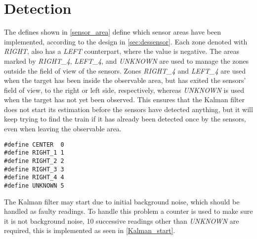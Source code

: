\section{Detection}\label{sec:detectionimp}
The defines shown in \cref{sensor_area} define which sensor areas have been implemented, according to the design in \cref{sec:dessensor}. Each zone denoted with \emph{RIGHT}, also has a \emph{LEFT} counterpart, where the value is negative. The areas marked by \emph{RIGHT\_4}, \emph{LEFT\_4}, and \emph{UNKNOWN} are used to manage the zones outside the field of view of the sensors. Zones \emph{RIGHT\_4} and \emph{LEFT\_4} are used when the target has been inside the observable area, but has exited the sensors' field of view, to the right or left side, respectively, whereas \emph{UNKNOWN} is used when the target has not yet been observed. This ensures that the Kalman filter does not start its estimation before the sensors have detected anything, but it will keep trying to find the train if it has already been detected once by the sensors, even when leaving the observable area.


\begin{lstlisting}[style=customc, label={sensor_area}, caption={Areas outside and inside the field of view of the sensors}]
#define CENTER  0
#define RIGHT_1 1
#define RIGHT_2 2
#define RIGHT_3 3
#define RIGHT_4 4
#define UNKNOWN 5
\end{lstlisting}

The Kalman filter may start due to initial background noise, which should be handled as faulty readings. To handle this problem a counter is used to make sure it is not background noise, 10 successive readings other than \emph{UNKNOWN} are required, this is implemented as seen in \cref{Kalman_start}. 

